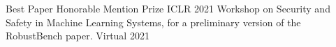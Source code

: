 
\begin{cvhonors}

  \cvhonor
    {Best Paper Honorable Mention Prize} %
    {ICLR 2021 Workshop on Security and Safety in Machine Learning Systems, for a preliminary version of the RobustBench paper.} %
    {Virtual} %
    {2021} %

\end{cvhonors}
